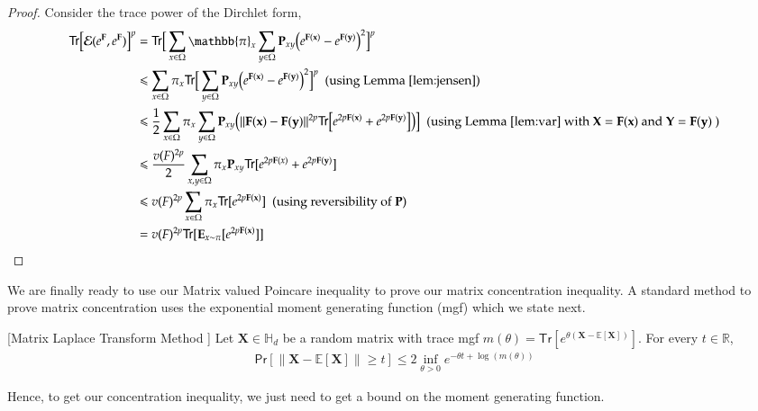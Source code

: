 \begin{proof}

  Consider the trace power of the Dirchlet form,
  \begin{align*}
    \mathsf{Tr}\big[\mathcal{E}(e^\mathbf{F},e^\mathbf{F})\big]^p &= \mathsf{Tr}\big[\sum\limits_{x \in \Omega} \mathbb{\pi}_x \sum\limits_{y \in \Omega}\mathbf{P}_{xy}\big(e^\mathbf{F(x)}-e^\mathbf{F(y)}\big)^2\big]^p\\
     &\leq \sum\limits_{x\in\Omega}\pi_x\mathsf{Tr}\big[\sum\limits_{y \in \Omega}\mathbf{P}_{xy}\big(e^\mathbf{F(x)}-e^\mathbf{F(y)}\big)^2\big]^p \ \ \text{(using Lemma \ref{lem:jensen})}\\
    &\leq \frac{1}{2}\sum\limits_{x\in\Omega}\pi_x\sum\limits_{y\in\Omega}\mathbf{P}_{xy}\big(\|\mathbf{F(x)}-\mathbf{F(y)}\|^{2p}\mathsf{Tr}\big[e^{2p\mathbf{F(x)}}+e^{2p\mathbf{F(y)}}\big]\big)\big]\ \ \text{(using Lemma \ref{lem:var} with } \mathbf{X} = \mathbf{F(x)} \text{ and } \mathbf{Y} = \mathbf{F(y)}\text{ )}\\
    &\leq \frac{v(F)^{2p}}{2}\sum\limits_{x,y \in \Omega}\pi_x \mathbf{P}_{xy}\mathsf{Tr}[e^{2p\mathbf{F}(x)}+e^{2p\mathbf{F(y)}}]\\
    &\leq v(F)^{2p} \sum\limits_{x\in\Omega}\pi_x \mathsf{Tr}[e^{2p\mathbf{F(x)}}] \ \ \text{(using reversibility of \textbf{P})}\\
    &=v(F)^{2p} \mathsf{Tr}[\mathbf{E}_{x \sim \pi}[e^{2p\mathbf{F(x)}}]]
\end{align*}
\end{proof}
We are finally ready to use our Matrix valued Poincare inequality to prove our matrix concentration inequality. A standard method to prove matrix concentration uses the exponential moment generating function (mgf) which we state next.
\begin{proposition}{[Matrix Laplace Transform Method \cite{TroppIntro15}]}\label{prop:mgf} Let $\mathbf{X} \in \mathbb{H}_d$ be a random matrix with trace mgf $m(\theta) = \mathsf{Tr}[e^{\theta (\mathbf{X}-\mathbb{E}[\mathbf{X}])}]$. For every $t \in \mathbb{R}$,
  \begin{align*}
    \mathsf{Pr}[\|\mathbf{X}-\mathbb{E}[\mathbf{X}]\|\geq t] \leq 2 \inf\limits_{\theta > 0}e^{-\theta t + \log(m(\theta))}
  \end{align*}
\end{proposition}
Hence, to get our concentration inequality, we just need to get a bound on the moment generating function.
